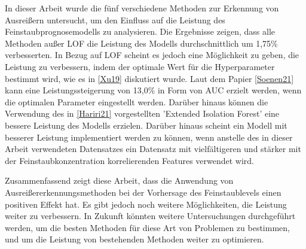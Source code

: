     
    In dieser Arbeit wurde die fünf verschiedene Methoden zur Erkennung von Ausreißern untersucht, um den Einfluss auf die Leistung des Feinstaubprognosemodells zu analysieren. Die Ergebnisse zeigen, dass alle Methoden außer LOF die Leistung des Modells durchschnittlich um 1,75\% verbesserten. In Bezug auf LOF scheint es jedoch eine Möglichkeit zu geben, die Leistung zu verbessern, indem der optimale Wert für die Hyperparameter bestimmt wird, wie es in \ref{Xu19} diskutiert wurde. Laut dem Papier \ref{Soenen21} kann eine Leistungssteigerung von 13,0\% in Form von AUC erzielt werden, wenn die optimalen Parameter eingestellt werden. Darüber hinaus können die Verwendung des in \ref{Hariri21} vorgestellten 'Extended Isolation Forest' eine bessere Leistung des Modells erzielen. Darüber hinaus scheint ein Modell mit besserer Leistung implementiert werden zu können, wenn anstelle des in dieser Arbeit verwendeten Datensatzes ein Datensatz mit vielfältigeren und stärker mit der Feinstaubkonzentration korrelierenden Features verwendet wird.

    Zusammenfassend zeigt diese Arbeit, dass die Anwendung von Ausreißererkennungsmethoden bei der Vorhersage des Feinstaublevels einen positiven Effekt hat. Es gibt jedoch noch weitere Möglichkeiten, die Leistung weiter zu verbessern. In Zukunft könnten weitere Untersuchungen durchgeführt werden, um die besten Methoden für diese Art von Problemen zu bestimmen, und um die Leistung von bestehenden Methoden weiter zu optimieren.




